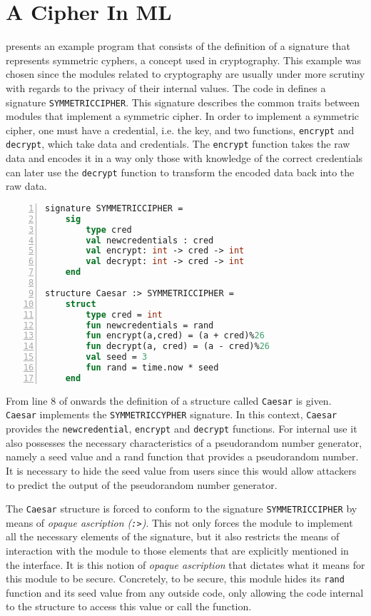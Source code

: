 \section{A Cipher In ML\label{sec:MLExample}}
 presents an example program that consists of the definition of a signature that represents symmetric cyphers, a concept used in cryptography.
This example was chosen since the modules related to cryptography are usually under more scrutiny with regards to the privacy of their internal values.
The code in  defines a signature \texttt{SYMMETRICCIPHER}.
This signature describes the common traits between modules that implement a symmetric cipher.
In order to implement a symmetric cipher, one must have a credential, i.e. the key, and two functions, \texttt{encrypt} and \texttt{decrypt}, which take data and credentials.
The \texttt{encrypt} function takes the raw data and encodes it in a way only those with knowledge of the correct credentials can later use the \texttt{decrypt} function to transform the encoded data back into the raw data.

\begin{lstlisting}[frame=single, language=ML,numbers=left, label=code:Example, caption=Example of a security sensitive module specifying and implementing a symmetric cypher.]
signature SYMMETRICCIPHER =
    sig 
        type cred
        val newcredentials : cred
        val encrypt: int -> cred -> int
        val decrypt: int -> cred -> int
    end

structure Caesar :> SYMMETRICCIPHER =
    struct
        type cred = int
        fun newcredentials = rand
        fun encrypt(a,cred) = (a + cred)%26
        fun decrypt(a, cred) = (a - cred)%26
        val seed = 3
        fun rand = time.now * seed
    end
\end{lstlisting}

From line 8 of  onwards the definition of a structure called \texttt{Caesar} is given.
\texttt{Caesar} implements the \texttt{SYMMETRICCYPHER} signature.
In this context, \texttt{Caesar} provides the \texttt{newcredential}, \texttt{encrypt} and \texttt{decrypt} functions.
For internal use it also possesses the necessary characteristics of a pseudorandom number generator, namely a seed value and a rand function that provides a pseudorandom number.
It is necessary to hide the seed value from users since this would allow attackers to predict the output of the pseudorandom number generator.

The \texttt{Caesar} structure is forced to conform to the signature \texttt{SYMMETRICCIPHER} by means of \emph{opaque ascription (\texttt{:>})}.
This not only forces the module to implement all the necessary elements of the signature, but it also restricts the means of interaction with the module to those elements that are explicitly mentioned in the interface.
It is this notion of \emph{opaque ascription} that dictates what it means for this module to be secure.
Concretely, to be secure, this module hides its \texttt{rand} function and its seed value from any outside code, only allowing the code internal to the structure to access this value or call the function.


